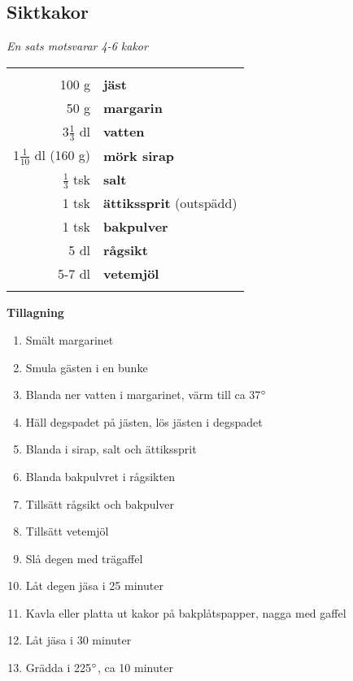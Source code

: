 \documentclass[a4paper,12pt]{article}
\newcommand{\sats}[1]{\noindent \textit{En sats motsvarar #1}}
\begin{document}
\clearpage

\subsection{Siktkakor}
\sats{4-6 kakor}

\begin{table}[H]
	\begin{tabular}{rl}
	\hline
	&\\
		100 g & \textbf{jäst}\\
		50 g & \textbf{margarin}\\
		3$\frac{1}{3}$ dl & \textbf{vatten} \\
		1$\frac{1}{10}$ dl (160 g) & \textbf{mörk sirap}\\
		$\frac{1}{3}$ tsk & \textbf{salt}\\
		1 tsk & \textbf{ättikssprit} (outspädd)\\
		1 tsk & \textbf{bakpulver}\\
		5 dl & \textbf{rågsikt}\\
		5-7 dl & \textbf{vetemjöl}\\
		&\\
	\hline
	\end{tabular}
\end{table}

\begin{multicols*}{2}

\noindent \textbf{Tillagning}
\begin{enumerate}
	\itemsep0cm
	\item Smält margarinet
	\item Smula gästen i en bunke
	\item Blanda ner vatten i margarinet, värm till ca 37$\degree$
	\item Häll degspadet på jästen, lös jästen i degspadet
	\item	Blanda i sirap, salt och ättikssprit
	\item Blanda bakpulvret i rågsikten
	\item Tillsätt rågsikt och bakpulver
	\item Tillsätt vetemjöl
	\item Slå degen med trägaffel
	\item Låt degen jäsa i 25 minuter
	\item Kavla eller platta ut kakor på bakplåtspapper, nagga med gaffel
	\item Låt jäsa i 30 minuter
	\item Grädda i 225$\degree$, ca 10 minuter
\end{enumerate}

\end{multicols*}
\end{document}
